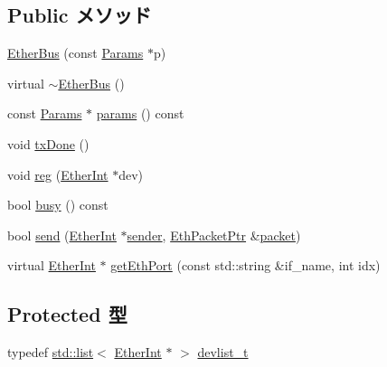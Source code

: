 \subsection*{Public メソッド}
\begin{DoxyCompactItemize}
\item 
\hyperlink{classEtherBus_ab73501ab17a42dc39bad5da11f6e490a}{EtherBus} (const \hyperlink{classEtherBus_af0984f6bd7717c1679765dfdacae4ddd}{Params} $\ast$p)
\item 
virtual \hyperlink{classEtherBus_a05588250081fe8f1dba9e46b0ac85da5}{$\sim$EtherBus} ()
\item 
const \hyperlink{classEtherBus_af0984f6bd7717c1679765dfdacae4ddd}{Params} $\ast$ \hyperlink{classEtherBus_acd3c3feb78ae7a8f88fe0f110a718dff}{params} () const 
\item 
void \hyperlink{classEtherBus_ac06188e141ad966d9d760cfcfc258587}{txDone} ()
\item 
void \hyperlink{classEtherBus_a97ce707445b2b82e64a1cd5a981d5ad5}{reg} (\hyperlink{classEtherInt}{EtherInt} $\ast$dev)
\item 
bool \hyperlink{classEtherBus_ab4dfde754c39017408feef7294770646}{busy} () const 
\item 
bool \hyperlink{classEtherBus_af0ac5d7bc5c392555ef3176bd27292f4}{send} (\hyperlink{classEtherInt}{EtherInt} $\ast$\hyperlink{classEtherBus_a748042e0d79456e5d2ec45a85392b06c}{sender}, \hyperlink{classRefCountingPtr}{EthPacketPtr} \&\hyperlink{classEtherBus_a8bd0d3f7eb9e8d7189c7027028a5fac0}{packet})
\item 
virtual \hyperlink{classEtherInt}{EtherInt} $\ast$ \hyperlink{classEtherBus_a10260c5a583c0894dcdcd1ced50a53ae}{getEthPort} (const std::string \&if\_\-name, int idx)
\end{DoxyCompactItemize}
\subsection*{Protected 型}
\begin{DoxyCompactItemize}
\item 
typedef \hyperlink{classstd_1_1list}{std::list}$<$ \hyperlink{classEtherInt}{EtherInt} $\ast$ $>$ \hyperlink{classEtherBus_aa7b4b8d9a39bc67842b5c47e1b2a1b19}{devlist\_\-t}
\end{DoxyCompactItemize}
